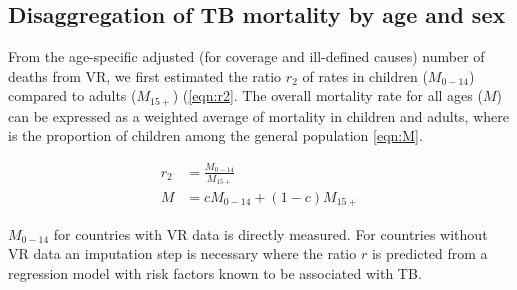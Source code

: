 \subsection{Disaggregation of TB mortality by age and sex}


From the age-specific adjusted (for coverage and ill-defined causes) number of deaths from VR, we first estimated the ratio $r_2$ of rates in children ($M_{0-14}$) compared to adults ($M_{15+}$) (\ref{eqn:r2}. The overall mortality rate for all ages ($M$) can be expressed as a weighted average of mortality in children and adults, where  is the proportion of children among the general population \ref{eqn:M}.


\begin{align}
r_2 &= \frac{M_{0-14}}{M_{15+}} \label{eqn:r2} \\
M &= c M_{0-14} + (1 - c) M_{15+} \label{eqn:M}
\end{align}

$M_{0-14}$ for countries with VR data is directly measured. For countries without VR data an imputation step is necessary where the ratio $r$ is predicted from a regression model with risk factors known to be associated with TB.
